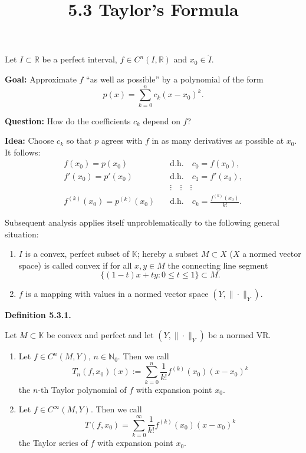 \documentclass[12pt]{article}
\title{5.3 Taylor's Formula}
\date{}
\newenvironment{definition}[1]{%
  \par\vspace{6pt}\noindent\textbf{Definition #1.}\itshape\space
}{%
  \par\vspace{6pt}
}
\begin{document}
\maketitle

Let $I \subset \mathbb{R}$ be a perfect interval, $f \in C^n(I, \mathbb{R})$ and $x_0 \in \mathring{I}$.

\textbf{Goal:} Approximate $f$ ``as well as possible'' by a polynomial of the form
\[
    p(x) = \sum_{k=0}^{n} c_k(x-x_0)^k.
\]

\textbf{Question:} How do the coefficients $c_k$ depend on $f$?

\textbf{Idea:} Choose $c_k$ so that $p$ agrees with $f$ in as many derivatives as possible at $x_0$. It follows:
\begin{align*}
    f(x_0) = p(x_0) \quad &\text{d.h.} \quad c_0 = f(x_0), \\
    f'(x_0) = p'(x_0) \quad &\text{d.h.} \quad c_1 = f'(x_0), \\
    &\vdots \quad \vdots \quad \vdots \\
    f^{(k)}(x_0) = p^{(k)}(x_0) \quad &\text{d.h.} \quad c_k = \frac{f^{(k)}(x_0)}{k!}.
\end{align*}

Subsequent analysis applies itself unproblematically to the following general situation:

\begin{enumerate}
    \item $I$ is a convex, perfect subset of $\mathbb{K}$; hereby a subset $M \subset X$ ($X$ a normed vector space) is called convex if for all $x, y \in M$ the connecting line segment
    \[
        \{(1-t)x + ty : 0 \leq t \leq 1\} \subset M.
    \]

    \item $f$ is a mapping with values in a normed vector space $(Y, \|\cdot\|_Y)$.
\end{enumerate}

\begin{definition}{5.3.1}
Let $M \subset \mathbb{K}$ be convex and perfect and let $(Y, \|\cdot\|_Y)$ be a normed VR.

\begin{enumerate}
    \item Let $f \in C^n(M, Y)$, $n \in \mathbb{N}_0$. Then we call
    \[
        T_n(f, x_0)(x) := \sum_{k=0}^{n} \frac{1}{k!}f^{(k)}(x_0)(x-x_0)^k
    \]
    the $n$-th Taylor polynomial of $f$ with expansion point $x_0$.

    \item Let $f \in C^\infty(M, Y)$. Then we call
    \[
        T(f, x_0) = \sum_{k=0}^{\infty} \frac{1}{k!}f^{(k)}(x_0)(x-x_0)^k
    \]
    the Taylor series of $f$ with expansion point $x_0$.
\end{enumerate}
\end{definition}
\end{document}
